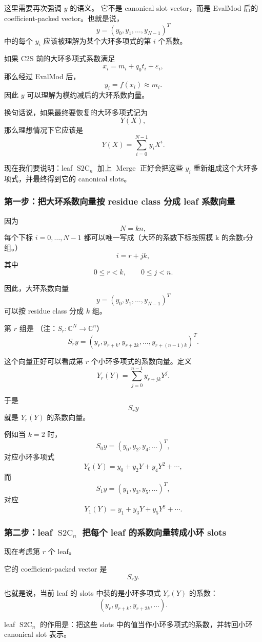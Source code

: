\documentclass[UTF8,11pt]{ctexart}
\theoremstyle{definition}
\newcommand{\StwoC}{\operatorname{S2C}}
\newcommand{\Merge}{\operatorname{Merge}}
\begin{document}
这里需要再次强调 \(y\) 的语义。  
它不是 canonical slot vector，而是 EvalMod 后的 coefficient-packed vector。也就是说，
\[
y=(y_0,y_1,\ldots,y_{N-1})^T
\]
中的每个 \(y_i\) 应该被理解为某个大环多项式的第 \(i\) 个系数。

如果 C2S 前的大环多项式系数满足
\[
x_i=m_i+q_0t_i+\varepsilon_i,
\]
那么经过 EvalMod 后，
\[
y_i=f(x_i)\approx m_i.
\]
因此 \(y\) 可以理解为模约减后的大环系数向量。

换句话说，如果最终要恢复的大环多项式记为
\[
Y(X),
\]
那么理想情况下它应该是
\[
Y(X)=\sum_{i=0}^{N-1}y_iX^i.
\]

现在我们要说明：leaf \(\StwoC_n\) 加上 \(\Merge\) 正好会把这些 \(y_i\) 重新组成这个大环多项式，并最终得到它的 canonical slots。

\subsubsection*{第一步：把大环系数向量按 residue class 分成 leaf 系数向量}

因为
\[
N=kn,
\]
每个下标 \(i=0,\ldots,N-1\) 都可以唯一写成（大环的系数下标按照模 k 的余数r分组。）
\[
i=r+jk,
\]
其中
\[
0\le r<k,\qquad 0\le j<n.
\]

因此，大环系数向量
\[
y=(y_0,y_1,\ldots,y_{N-1})^T
\]
可以按 residue class 分成 \(k\) 组。

第 \(r\) 组是 （注：$S_r:\mathbb{C}^N\to\mathbb{C}^n$）
\[
S_ry
=
(y_r,y_{r+k},y_{r+2k},\ldots,y_{r+(n-1)k})^T.
\]

这个向量正好可以看成第 \(r\) 个小环多项式的系数向量。定义
\[
Y_r(Y)
=
\sum_{j=0}^{n-1}y_{r+jk}Y^j.
\]

于是
\[
S_ry
\]
就是 \(Y_r(Y)\) 的系数向量。

例如当 \(k=2\) 时，
\[
S_0y=(y_0,y_2,y_4,\ldots)^T,
\]
对应小环多项式
\[
Y_0(Y)=y_0+y_2Y+y_4Y^2+\cdots,
\]
而
\[
S_1y=(y_1,y_3,y_5,\ldots)^T,
\]
对应
\[
Y_1(Y)=y_1+y_3Y+y_5Y^2+\cdots.
\]

\subsubsection*{第二步：leaf \(\StwoC_n\) 把每个 leaf 的系数向量转成小环 slots}

现在考虑第 \(r\) 个 leaf。

它的 coefficient-packed vector 是
\[
S_ry.
\]

也就是说，当前 leaf 的 slots 中装的是小环多项式 \(Y_r(Y)\) 的系数：
\[
(y_r,y_{r+k},y_{r+2k},\ldots).
\]

leaf \(\StwoC_n\) 的作用是：把这些 slots 中的值当作小环多项式的系数，并转回小环 canonical slot 表示。
\end{document}
